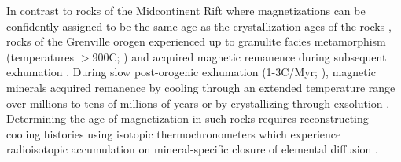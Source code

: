 In contrast to rocks of the Midcontinent Rift where magnetizations can be confidently assigned to be the same age as the crystallization ages of the rocks \cite[e.g.][]{Davis1997a,Fairchild2017a,Swanson-Hysell2019a}, rocks of the Grenville orogen experienced up to granulite facies metamorphism (temperatures $>$900\textdegree C; \citealp[e.g.][]{Shinevar2021a, Metzger2021a}) and acquired magnetic remanence during subsequent exhumation \citep{McWilliams1975a, Dunlop1985a, Dodson1985a}. During slow post-orogenic exhumation (1-3\textdegree C/Myr; \citealp[e.g.][]{Rivers2023a}), magnetic minerals acquired remanence by cooling through an extended temperature range over millions to tens of millions of years \citep{Pullaiah1975a, Dodson1980a} or by crystallizing through exsolution \citep{McEnroe2007a}. Determining the age of magnetization in such rocks requires reconstructing cooling histories using isotopic thermochronometers which experience radioisotopic accumulation on mineral-specific closure of elemental diffusion \citep{Dodson1973a, Dodson1985a}. 

